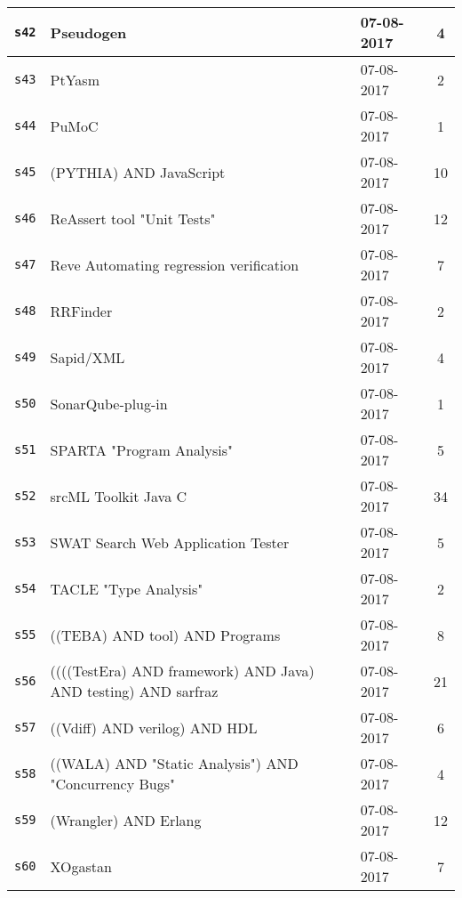 \begin{longtable}{| l | p{13cm} | l | c |}
\texttt{s42} & Pseudogen & 07-08-2017 & 4 \\
    \hline
\texttt{s43} & PtYasm & 07-08-2017 & 2 \\
    \hline
\texttt{s44} & PuMoC & 07-08-2017 & 1 \\
    \hline
\texttt{s45} & (PYTHIA) AND JavaScript & 07-08-2017 & 10 \\
    \hline
\texttt{s46} & ReAssert tool "Unit Tests" & 07-08-2017 & 12 \\
    \hline
\texttt{s47} & Reve Automating regression verification & 07-08-2017 & 7 \\
    \hline
\texttt{s48} & RRFinder & 07-08-2017 & 2 \\
    \hline
\texttt{s49} & Sapid/XML & 07-08-2017 & 4 \\
    \hline
\texttt{s50} & SonarQube-plug-in & 07-08-2017 & 1 \\
    \hline
\texttt{s51} & SPARTA "Program Analysis" & 07-08-2017 & 5 \\
    \hline
\texttt{s52} & srcML Toolkit Java C & 07-08-2017 & 34 \\
    \hline
\texttt{s53} & SWAT Search Web Application Tester & 07-08-2017 & 5 \\
    \hline
\texttt{s54} & TACLE "Type Analysis" & 07-08-2017 & 2 \\
    \hline
\texttt{s55} & ((TEBA) AND tool) AND Programs & 07-08-2017 & 8 \\
    \hline
\texttt{s56} & ((((TestEra) AND framework) AND Java) AND testing) AND sarfraz & 07-08-2017 & 21 \\
    \hline
\texttt{s57} & ((Vdiff) AND verilog) AND HDL & 07-08-2017 & 6 \\
    \hline
\texttt{s58} & ((WALA) AND "Static Analysis") AND "Concurrency Bugs" & 07-08-2017 & 4 \\
    \hline
\texttt{s59} & (Wrangler) AND Erlang & 07-08-2017 & 12 \\
    \hline
\texttt{s60} & XOgastan & 07-08-2017 & 7 \\
    \hline
  \hline
\end{longtable}
